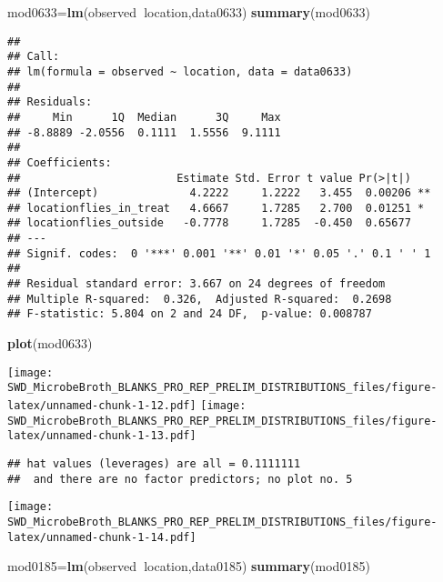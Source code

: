 \documentclass[]{article}
\newenvironment{Shaded}{\begin{snugshade}}{\end{snugshade}}
\newcommand{\KeywordTok}[1]{\textcolor[rgb]{0.13,0.29,0.53}{\textbf{#1}}}
\newcommand{\OperatorTok}[1]{\textcolor[rgb]{0.81,0.36,0.00}{\textbf{#1}}}
\newcommand{\NormalTok}[1]{#1}
\begin{document}
\begin{Shaded}
\begin{Highlighting}[]
\NormalTok{mod0633=}\KeywordTok{lm}\NormalTok{(observed}\OperatorTok{~}\NormalTok{location,data0633)}
\KeywordTok{summary}\NormalTok{(mod0633)}
\end{Highlighting}
\end{Shaded}

\begin{verbatim}
## 
## Call:
## lm(formula = observed ~ location, data = data0633)
## 
## Residuals:
##     Min      1Q  Median      3Q     Max 
## -8.8889 -2.0556  0.1111  1.5556  9.1111 
## 
## Coefficients:
##                        Estimate Std. Error t value Pr(>|t|)   
## (Intercept)              4.2222     1.2222   3.455  0.00206 **
## locationflies_in_treat   4.6667     1.7285   2.700  0.01251 * 
## locationflies_outside   -0.7778     1.7285  -0.450  0.65677   
## ---
## Signif. codes:  0 '***' 0.001 '**' 0.01 '*' 0.05 '.' 0.1 ' ' 1
## 
## Residual standard error: 3.667 on 24 degrees of freedom
## Multiple R-squared:  0.326,  Adjusted R-squared:  0.2698 
## F-statistic: 5.804 on 2 and 24 DF,  p-value: 0.008787
\end{verbatim}

\begin{Shaded}
\begin{Highlighting}[]
\KeywordTok{plot}\NormalTok{(mod0633)}
\end{Highlighting}
\end{Shaded}

\texttt{[image: SWD\_MicrobeBroth\_BLANKS\_PRO\_REP\_PRELIM\_DISTRIBUTIONS\_files/figure-latex/unnamed-chunk-1-12.pdf]}
\texttt{[image: SWD\_MicrobeBroth\_BLANKS\_PRO\_REP\_PRELIM\_DISTRIBUTIONS\_files/figure-latex/unnamed-chunk-1-13.pdf]}

\begin{verbatim}
## hat values (leverages) are all = 0.1111111
##  and there are no factor predictors; no plot no. 5
\end{verbatim}

\texttt{[image: SWD\_MicrobeBroth\_BLANKS\_PRO\_REP\_PRELIM\_DISTRIBUTIONS\_files/figure-latex/unnamed-chunk-1-14.pdf]}

\begin{Shaded}
\begin{Highlighting}[]
\NormalTok{mod0185=}\KeywordTok{lm}\NormalTok{(observed}\OperatorTok{~}\NormalTok{location,data0185)}
\KeywordTok{summary}\NormalTok{(mod0185)}
\end{Highlighting}
\end{Shaded}
\end{document}
